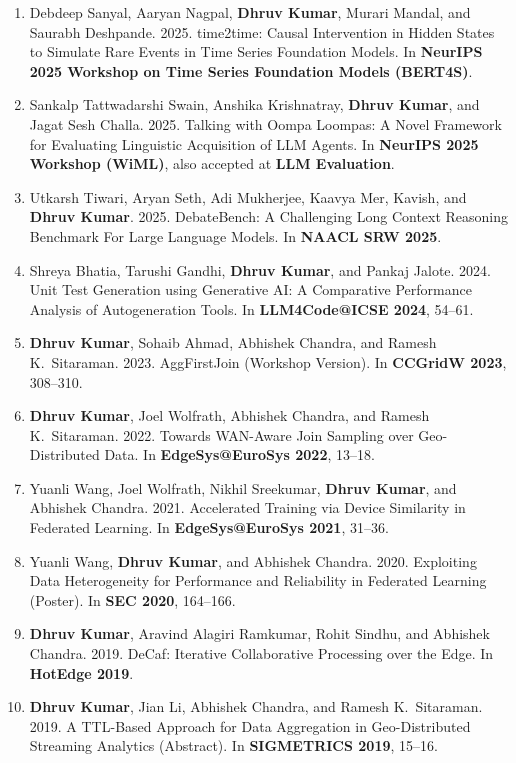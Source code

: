 \documentclass[10pt, a4paper]{article}
\begin{document}
\begin{enumerate}[label=\textbf{W\arabic*.}, leftmargin=2.8em, itemsep=0.3em]
\item Debdeep Sanyal, Aaryan Nagpal, \textbf{Dhruv Kumar}, Murari Mandal, and Saurabh Deshpande. 2025. time2time: Causal Intervention in Hidden States to Simulate Rare Events in Time Series Foundation Models. In \textbf{NeurIPS 2025 Workshop on Time Series Foundation Models (BERT4S)}.

\item Sankalp Tattwadarshi Swain, Anshika Krishnatray, \textbf{Dhruv Kumar}, and Jagat Sesh Challa. 2025. Talking with Oompa Loompas: A Novel Framework for Evaluating Linguistic Acquisition of LLM Agents. In \textbf{NeurIPS 2025 Workshop (WiML)}, also accepted at \textbf{LLM Evaluation}.

\item Utkarsh Tiwari, Aryan Seth, Adi Mukherjee, Kaavya Mer, Kavish, and \textbf{Dhruv Kumar}. 2025. DebateBench: A Challenging Long Context Reasoning Benchmark For Large Language Models. In \textbf{NAACL SRW 2025}.

\item Shreya Bhatia, Tarushi Gandhi, \textbf{Dhruv Kumar}, and Pankaj Jalote. 2024. Unit Test Generation using Generative AI: A Comparative Performance Analysis of Autogeneration Tools. In \textbf{LLM4Code@ICSE 2024}, 54--61.

\item \textbf{Dhruv Kumar}, Sohaib Ahmad, Abhishek Chandra, and Ramesh K.\ Sitaraman. 2023. AggFirstJoin (Workshop Version). In \textbf{CCGridW 2023}, 308--310.

\item \textbf{Dhruv Kumar}, Joel Wolfrath, Abhishek Chandra, and Ramesh K.\ Sitaraman. 2022. Towards WAN-Aware Join Sampling over Geo-Distributed Data. In \textbf{EdgeSys@EuroSys 2022}, 13--18.

\item Yuanli Wang, Joel Wolfrath, Nikhil Sreekumar, \textbf{Dhruv Kumar}, and Abhishek Chandra. 2021. Accelerated Training via Device Similarity in Federated Learning. In \textbf{EdgeSys@EuroSys 2021}, 31--36.

\item Yuanli Wang, \textbf{Dhruv Kumar}, and Abhishek Chandra. 2020. Exploiting Data Heterogeneity for Performance and Reliability in Federated Learning (Poster). In \textbf{SEC 2020}, 164--166.

\item \textbf{Dhruv Kumar}, Aravind Alagiri Ramkumar, Rohit Sindhu, and Abhishek Chandra. 2019. DeCaf: Iterative Collaborative Processing over the Edge. In \textbf{HotEdge 2019}.

\item \textbf{Dhruv Kumar}, Jian Li, Abhishek Chandra, and Ramesh K.\ Sitaraman. 2019. A TTL-Based Approach for Data Aggregation in Geo-Distributed Streaming Analytics (Abstract). In \textbf{SIGMETRICS 2019}, 15--16.

\end{enumerate}
\end{document}
